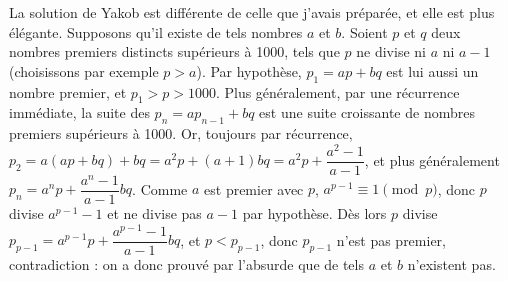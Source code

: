 \begin{sol}

\medskip

La solution de Yakob est différente de celle que j'avais préparée, et elle est plus élégante. Supposons qu'il existe de tels nombres $a$ et $b$. Soient $p$ et $q$ deux nombres premiers distincts supérieurs à 1000, tels que $p$ ne divise ni $a$ ni $a-1$ (choisissons par exemple $p > a$). Par hypothèse, $p_1 = ap + bq$ est lui aussi un nombre premier, et $p_1 > p > 1000$. Plus généralement, par une récurrence immédiate, la suite des $p_n = ap_{n-1} + bq$ est une suite croissante de nombres premiers supérieurs à 1000. Or, toujours par récurrence, $p_2 = a(ap+bq) + bq = a^2p + (a+1)bq = a^2p + \dfrac{a^2-1}{a-1}$, et plus généralement $p_n = a^np + \dfrac{a^n-1}{a-1}bq$. Comme $a$ est premier avec $p$, $a^{p-1} \equiv 1 \pmod{p}$, donc $p$ divise $a^{p-1} - 1$ et ne divise pas $a-1$ par hypothèse. Dès lors $p$ divise $p_{p-1} = a^{p-1}p + \dfrac{a^{p-1}-1}{a-1}bq$, et $p < p_{p-1}$, donc $p_{p-1}$ n'est pas premier, contradiction : on a donc prouvé par l'absurde que de tels $a$ et $b$ n'existent pas. 

\end{sol}

